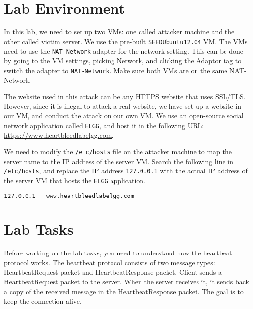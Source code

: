 \section{Lab Environment}

In this lab, we need to set up two VMs: one called attacker machine 
and the other called victim server.  We use the 
pre-built \texttt{SEEDUbuntu12.04} VM. The VMs need to use the 
\texttt{NAT-Network} adapter
for the network setting. This can be done by going to the VM settings,
picking Network, and clicking the Adaptor tag to switch the adapter to
\texttt{NAT-Network}. Make sure both VMs are on the same NAT-Network.

The website used in this attack can be any HTTPS website that uses SSL/TLS.
However, since it is illegal to attack a real website, we 
have set up a website in our VM, and conduct the attack on our own VM.
We use an open-source social network application called \texttt{ELGG},
and host it in the following URL: \url{https://www.heartbleedlabelgg.com}.

We need to modify the \texttt{/etc/hosts} file on the attacker
machine to map the server name to the IP address of 
the server VM. Search the following line in \texttt{/etc/hosts}, and 
replace the IP address \texttt{127.0.0.1} with the actual IP address of the
server VM that hosts the \texttt{ELGG} application.


\begin{lstlisting}
127.0.0.1	www.heartbleedlabelgg.com
\end{lstlisting}
 
 


\section{Lab Tasks}


Before working on the lab tasks, you need to understand how the heartbeat
protocol works.
The heartbeat protocol consists of two message types:
HeartbeatRequest packet and HeartbeatResponse packet. Client sends a
HeartbeatRequest packet to the server. When the server receives it, it 
sends back a copy of the received message in the HeartbeatResponse packet.
The goal is to keep the connection alive. 




